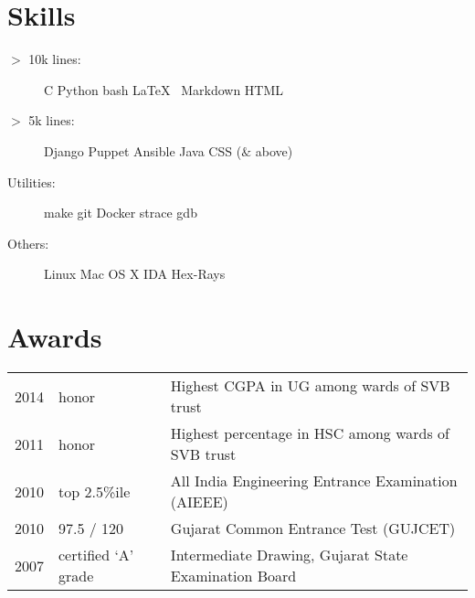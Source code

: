 \documentclass[margin]{res}
\begin{document}
\begin{resume}
\section{Skills}
\begin{description}
    \item[$>$ 10k lines:]
        C \textbullet{}
        Python \textbullet{}
        bash \textbullet{}
        \LaTeX\ \textbullet{}
        Markdown \textbullet{}
        HTML

    \item[$>$ 5k lines:]
        Django \textbullet{}
        Puppet \textbullet{}
        Ansible \textbullet{}
        Java \textbullet{}
        CSS ($\&$ above)

    \item[Utilities:]
        make \textbullet{}
        git \textbullet{}
        Docker \textbullet{}
        strace \textbullet{}
        gdb

    \item[Others:]
        Linux \textbullet{}
        Mac OS X \textbullet{}
        IDA Hex-Rays
\end{description}

\section{Awards} 
\begin{tabular}{rll}
2014 & honor & Highest CGPA in UG among wards of SVB trust\\
2011 & honor & Highest percentage in HSC among wards of SVB trust\\
2010 & top 2.5\%ile & All India Engineering Entrance Examination (AIEEE)\\
2010 & 97.5 / 120 & Gujarat Common Entrance Test (GUJCET)\\
2007 & certified `A' grade & Intermediate Drawing, Gujarat State Examination Board\\
\end{tabular}


\end{resume} 
\end{document}

